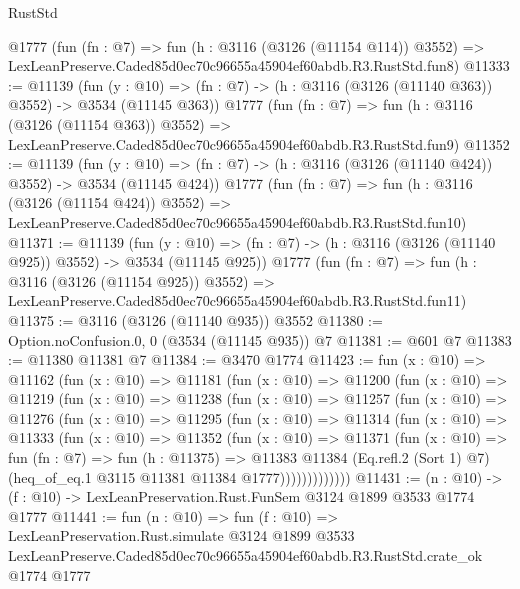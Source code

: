 \begin{lexlean}{RustStd}
\begin{coremodule}
    @1777
    (fun (fn : @7) =>
    fun (h : @3116 (@3126 (@11154 @114)) @3552) =>
    LexLeanPreserve.Caded85d0ec70c96655a45904ef60abdb.R3.RustStd.fun8)
@11333 := @11139
    (fun (y : @10) => (fn : @7) -> (h : @3116 (@3126 (@11140 @363)) @3552) -> @3534 (@11145 @363))
    @1777
    (fun (fn : @7) =>
    fun (h : @3116 (@3126 (@11154 @363)) @3552) =>
    LexLeanPreserve.Caded85d0ec70c96655a45904ef60abdb.R3.RustStd.fun9)
@11352 := @11139
    (fun (y : @10) => (fn : @7) -> (h : @3116 (@3126 (@11140 @424)) @3552) -> @3534 (@11145 @424))
    @1777
    (fun (fn : @7) =>
    fun (h : @3116 (@3126 (@11154 @424)) @3552) =>
    LexLeanPreserve.Caded85d0ec70c96655a45904ef60abdb.R3.RustStd.fun10)
@11371 := @11139
    (fun (y : @10) => (fn : @7) -> (h : @3116 (@3126 (@11140 @925)) @3552) -> @3534 (@11145 @925))
    @1777
    (fun (fn : @7) =>
    fun (h : @3116 (@3126 (@11154 @925)) @3552) =>
    LexLeanPreserve.Caded85d0ec70c96655a45904ef60abdb.R3.RustStd.fun11)
@11375 := @3116 (@3126 (@11140 @935)) @3552
@11380 := Option.noConfusion.{0, 0} (@3534 (@11145 @935)) @7
@11381 := @601 @7
@11383 := @11380 @11381 @7
@11384 := @3470 @1774
@11423 := fun (x : @10) =>
  @11162
    (fun (x : @10) =>
    @11181
      (fun (x : @10) =>
      @11200
        (fun (x : @10) =>
        @11219
          (fun (x : @10) =>
          @11238
            (fun (x : @10) =>
            @11257
              (fun (x : @10) =>
              @11276
                (fun (x : @10) =>
                @11295
                  (fun (x : @10) =>
                  @11314
                    (fun (x : @10) =>
                    @11333
                      (fun (x : @10) =>
                      @11352
                        (fun (x : @10) =>
                        @11371
                          (fun (x : @10) =>
                          fun (fn : @7) =>
                          fun (h : @11375) =>
                          @11383
                            @11384
                            (Eq.refl.{2} (Sort 1) @7)
                            (heq_of_eq.{1} @3115 @11381 @11384 @1777)))))))))))))
@11431 := (n : @10) -> (f : @10) -> LexLeanPreservation.Rust.FunSem @3124 @1899 @3533 @1774 @1777
@11441 := fun (n : @10) =>
  fun (f : @10) =>
  LexLeanPreservation.Rust.simulate
    @3124
    @1899
    @3533
    LexLeanPreserve.Caded85d0ec70c96655a45904ef60abdb.R3.RustStd.crate_ok
    @1774
    @1777
\end{coremodule}
\end{lexlean}
